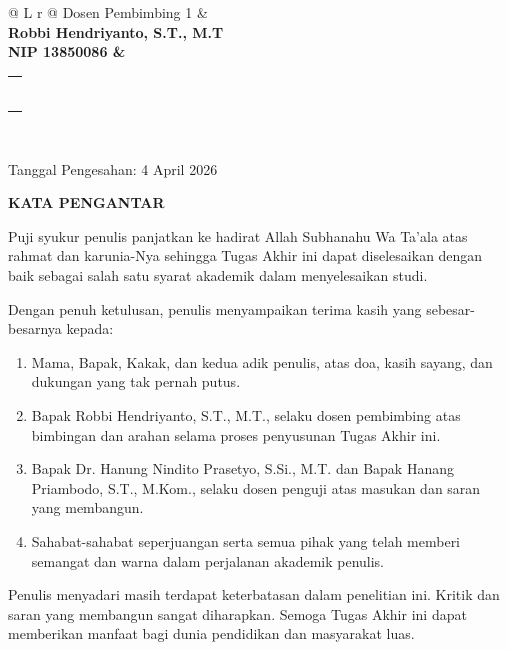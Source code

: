 \vspace{1.5cm}

\noindent
\begin{tabularx}{\textwidth}{@{} L r @{}}
    Dosen Pembimbing 1 & \\
    \bfseries Robbi Hendriyanto, S.T., M.T \\ NIP 13850086 & \begin{tabular}[t]{c} \\[0cm] \rule{6.5cm}{0.4pt} \end{tabular} \\ 
\end{tabularx}

\vfill

\noindent
Tanggal Pengesahan: 4 April 2026
\fi

\iffalse
\newpage
\begin{center}
    {\large\bfseries KATA PENGANTAR \par}
\end{center}
\vspace{0.5cm}

Puji syukur penulis panjatkan ke hadirat Allah Subhanahu Wa Ta'ala atas rahmat dan karunia-Nya sehingga Tugas Akhir ini dapat diselesaikan dengan baik sebagai salah satu syarat akademik dalam menyelesaikan studi.

Dengan penuh ketulusan, penulis menyampaikan terima kasih yang sebesar-besarnya kepada:

\begin{enumerate}
    \item Mama, Bapak, Kakak, dan kedua adik penulis, atas doa, kasih sayang, dan dukungan yang tak pernah putus.
    \item Bapak Robbi Hendriyanto, S.T., M.T., selaku dosen pembimbing atas bimbingan dan arahan selama proses penyusunan Tugas Akhir ini.
    \item Bapak Dr. Hanung Nindito Prasetyo, S.Si., M.T. dan Bapak Hanang Priambodo, S.T., M.Kom., selaku dosen penguji atas masukan dan saran yang membangun.
    \item Sahabat-sahabat seperjuangan serta semua pihak yang telah memberi semangat dan warna dalam perjalanan akademik penulis.
\end{enumerate}

\noindent
Penulis menyadari masih terdapat keterbatasan dalam penelitian ini. Kritik dan saran yang membangun sangat diharapkan. Semoga Tugas Akhir ini dapat memberikan manfaat bagi dunia pendidikan dan masyarakat luas.


